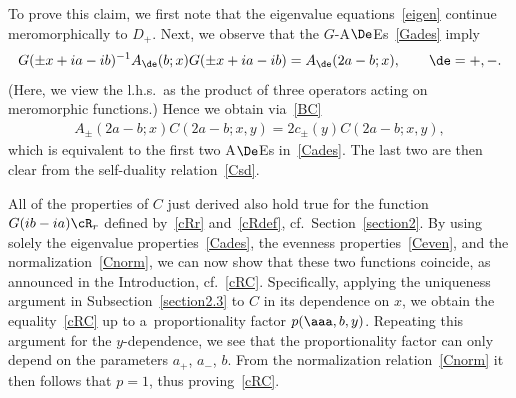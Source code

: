 \documentclass[pdftex]{sigma}
\numberwithin{equation}{section}
\begin{document}
 To prove this claim, we f\/irst note that the eigenvalue equations~\eqref{eigen} continue meromorphically to $D_+$. Next, we observe that the $G$-A$\De$Es~\eqref{Gades} imply
\begin{gather}
G(\pm x +ia-ib)^{-1}A_{\de}(b;x)G(\pm x +ia-ib)=A_{\de}(2a-b;x),\qquad \de=+,-.
\end{gather}
(Here, we view the l.h.s.\ as the product of three operators acting on meromorphic functions.)
Hence we obtain via~\eqref{BC}
\begin{gather}
A_{\pm}(2a-b;x)C(2a-b;x,y)=2c_{\pm}(y)C(2a-b;x,y),
\end{gather}
which is equivalent to the f\/irst two A$\De$Es in~\eqref{Cades}. The last two are then clear from the self-duality relation~\eqref{Csd}.

All of the properties of $C$ just derived also hold true for the function $G(ib-ia)\cR_r$ def\/ined by~\eqref{cRr} and~\eqref{cRdef}, cf.~Section~\ref{section2}. By using solely the eigenvalue properties~\eqref{Cades}, the evenness properties~\eqref{Ceven}, and the normalization~\eqref{Cnorm}, we can now show that these two functions coincide, as announced in the Introduction, cf.~\eqref{cRC}. Specif\/ically, applying the uniqueness argument in Subsection~\ref{section2.3} to $C$ in its dependence on $x$, we obtain the equality~\eqref{cRC} up to a~proportionality factor $p(\aaa,b,y)$. Repeating this argument for the $y$-dependence, we see that the proportionality factor can only depend on the parameters $a_+$, $a_-$, $b$. From the normalization relation~\eqref{Cnorm} it then follows that $p=1$, thus proving~\eqref{cRC}.
\end{document}
